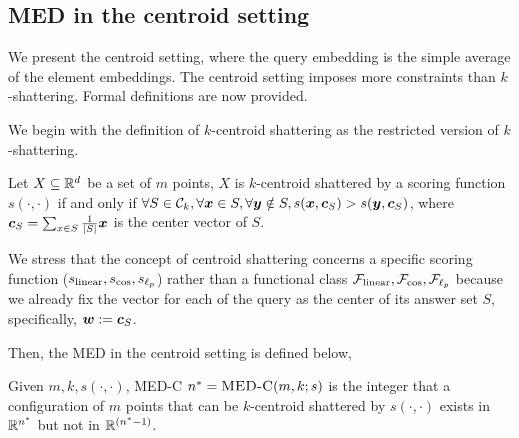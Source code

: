 \documentclass[10pt]{article}
\begin{document}
\subsection{MED in the centroid setting}\label{sec:maed}
We present the centroid setting, where the query embedding is the simple average of the element embeddings. The centroid setting imposes more constraints than $k$-shattering. Formal definitions are now provided.

We begin with the definition of $k$-centroid shattering as the restricted version of $k$-shattering.
\begin{definition}
    Let $X\subseteq \mathbb{R}^d$ be a set of $m$ points, $X$ is $k$-centroid shattered by a scoring function $s(\cdot, \cdot)$ if and only if $\forall S\in \mathcal{C}_k, \forall \bm{x}\in S, \forall \bm{y} \notin S, s(\bm{x}, \bm{c}_S) > s(\bm{y}, \bm{c}_S)$, where $\bm{c}_S = \sum_{x \in S} \frac{1}{|S|}\bm{x}$ is the center vector of $S$.
\end{definition}
\begin{remark}
    We stress that the concept of centroid shattering concerns a specific scoring function ($s_{\rm linear}, s_{\cos}, s_{\ell_p}$) rather than a functional class $\mathcal{F}_{\rm linear}, \mathcal{F}_{\cos}, \mathcal{F}_{\ell_p}$ because we already fix the vector for each of the query as the center of its answer set $S$, specifically, $\bm{w}:= \bm{c}_S$.
\end{remark}

Then, the MED in the centroid setting is defined below,
\begin{definition}
    Given $m, k, s(\cdot, \cdot)$, MED-C $n^* = \textsc{MED-C}(m, k; s)$ is the integer that a configuration of $m$ points that can be $k$-centroid shattered by $s(\cdot, \cdot)$ exists in $\mathbb{R}^{n^*}$ but not in $\mathbb{R}^{(n^*-1)}$.
\end{definition}
\end{document}
